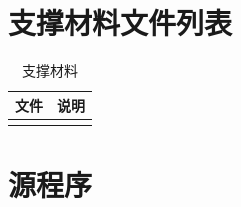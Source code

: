 \appendix
\section{支撑材料文件列表}

\begin{table}[H]
  \centering
  \caption{支撑材料}
  \label{tab:support}
  \begin{tabularx}{\textwidth}{lX}
    \toprule
    文件 & 说明 \\
    \midrule
     &  \\
    \bottomrule
  \end{tabularx}
\end{table}

\section{源程序}

